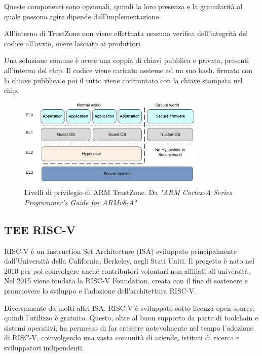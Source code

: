 \documentclass[12pt,italian]{report}
\begin{document}
	Queste componenti sono opzionali, quindi la loro presenza e la granularità al quale possono agire dipende dall'implementazione.
	
	\bigbreak 
	
	All'interno di TrustZone non viene effettuata nessuna verifica dell'integrità del codice all'avvio, onere lasciato ai produttori.
	
	Una soluzione comune è avere una coppia di chiavi pubblica e privata, presenti all'interno del chip. Il codice viene caricato assieme ad un suo hash, firmato con la chiave pubblica e poi il tutto viene confrontato con la chiave stampata nel chip.
	
	\begin{figure}[t]
		\centering
		\includegraphics[width=0.8\textwidth]{immagini/ARM_TZ_Levels}
		\caption{
			Livelli di privilegio di ARM TrustZone. Da \textit{"ARM Cortex-A Series Programmer's Guide for ARMv8-A"}
			\cite{arm_programmers_manual}
		}
		\label{fig:arm-exception-levels}
	\end{figure}
	
	\subsection{TEE RISC-V}
	\label{subsec:riscv}
	RISC-V è un Instruction Set Architecture (ISA) sviluppato principalmente dall'Università della California, Berkeley, negli Stati Uniti. Il progetto è nato nel 2010 per poi coinvolgere anche contributori volontari non affiliati all'università. Nel 2015 viene fondata la RISC-V Foundation, creata con il fine di sostenere e promuovere lo sviluppo e l'adozione dell'architettura RISC-V.
	
	Diversamente da molti altri ISA, RISC-V è sviluppato sotto licenza open source, quindi l'utilizzo è gratuito. Questo, oltre al buon supporto da parte di toolchain e sistemi operativi, ha permesso di far crescere notevolmente nel tempo l'adozione di RISC-V, coinvolgendo una vasta comunità di aziende, istituti di ricerca e sviluppatori indipendenti. 
	
\end{document}
